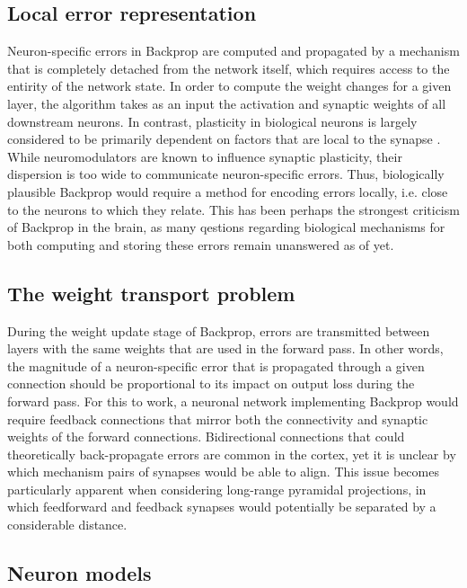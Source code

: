\subsection{Local error representation}

Neuron-specific errors in Backprop are computed and propagated by a mechanism that is completely detached from the
network itself, which requires access to the entirity of the network state. In order to compute the weight changes for a
given layer, the algorithm takes as an input the activation and synaptic weights of all downstream neurons. In contrast,
plasticity in biological neurons is largely considered to be primarily dependent on factors that are local to the
synapse \citep{Abbott2000,magee2020synaptic,urbanczik2014learning}. While neuromodulators are known to influence
synaptic plasticity, their dispersion is too wide to communicate neuron-specific errors. Thus, biologically plausible
Backprop would require a method for encoding errors locally, i.e. close to the neurons to which they relate. This has
been perhaps the strongest criticism of Backprop in the brain, as many qestions regarding biological mechanisms for both
computing and storing these errors remain unanswered as of yet.

\subsection{The weight transport problem}

During the weight update stage of Backprop, errors are transmitted between layers with the same weights that are used in
the forward pass. In other words, the magnitude of a neuron-specific error that is propagated through a given connection
should be proportional to its impact on output loss during the forward pass. For this to work, a neuronal network
implementing Backprop would require feedback connections that mirror both the connectivity and synaptic weights of the
forward connections. Bidirectional connections that could theoretically back-propagate errors are common in the cortex,
yet it is unclear by which mechanism pairs of synapses would be able to align. This issue becomes particularly apparent
when considering long-range pyramidal projections, in which feedforward and feedback synapses would potentially be
separated by a considerable distance.

\subsection{Neuron models}

